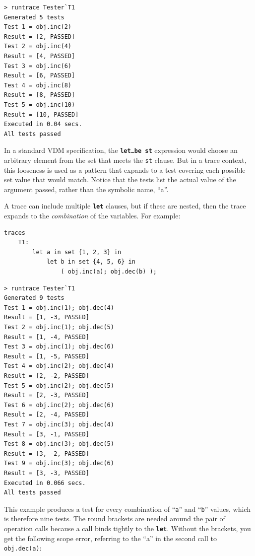 \documentclass{overturerepchap}
\begin{document}
\lstset{style=tool,language=}
\begin{lstlisting}[escapechar=@]
> runtrace Tester`T1
Generated 5 tests
Test 1 = obj.inc(2)
Result = [2, PASSED]
Test 2 = obj.inc(4)
Result = [4, PASSED]
Test 3 = obj.inc(6)
Result = [6, PASSED]
Test 4 = obj.inc(8)
Result = [8, PASSED]
Test 5 = obj.inc(10)
Result = [10, PASSED]
Executed in 0.04 secs. 
All tests passed
\end{lstlisting}
\lstset{style=mystyle}
\lstset{language=VDM++}
\normalsize

In a standard VDM specification, the \texttt{\textbf{let}\ldots \textbf{be st}} expression would
choose an arbitrary element from the set that meets the \texttt{st} clause. But
in a trace context, this looseness is used as a pattern that expands to a test
covering each possible set value that would match. Notice that the tests list
the actual value of the argument passed, rather than the symbolic name, ``a''.

A trace can include multiple \texttt{\textbf{let}} clauses, but if these are nested, then
the trace expands to the \emph{combination} of the variables. For example:

\small
\begin{lstlisting}
traces
    T1:
        let a in set {1, 2, 3} in
            let b in set {4, 5, 6} in
                ( obj.inc(a); obj.dec(b) );
\end{lstlisting}

\lstset{style=tool,language=}
\begin{lstlisting}[escapechar=@]
> runtrace Tester`T1
Generated 9 tests
Test 1 = obj.inc(1); obj.dec(4)
Result = [1, -3, PASSED]
Test 2 = obj.inc(1); obj.dec(5)
Result = [1, -4, PASSED]
Test 3 = obj.inc(1); obj.dec(6)
Result = [1, -5, PASSED]
Test 4 = obj.inc(2); obj.dec(4)
Result = [2, -2, PASSED]
Test 5 = obj.inc(2); obj.dec(5)
Result = [2, -3, PASSED]
Test 6 = obj.inc(2); obj.dec(6)
Result = [2, -4, PASSED]
Test 7 = obj.inc(3); obj.dec(4)
Result = [3, -1, PASSED]
Test 8 = obj.inc(3); obj.dec(5)
Result = [3, -2, PASSED]
Test 9 = obj.inc(3); obj.dec(6)
Result = [3, -3, PASSED]
Executed in 0.066 secs. 
All tests passed
\end{lstlisting}
\lstset{style=mystyle}
\lstset{language=VDM++}
\normalsize

This example produces a test for every combination of ``\texttt{a}'' and ``\texttt{b}'' values,
which is therefore nine tests. The round brackets are needed around the pair of
operation calls because a call binds tightly to the \texttt{\textbf{let}}. Without the
brackets, you get the following scope error, referring to the ``a'' in the
second call to \texttt{obj.dec(a)}:
\end{document}
